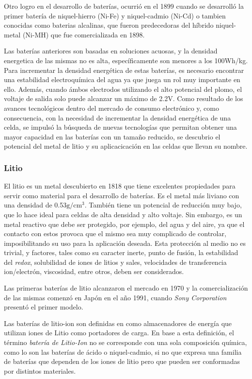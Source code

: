 \documentclass[10pt,a4paper]{article}
\begin{document}
\noindent Otro logro en el desarrollo de baterías, ocurrió en el 1899 cuando se
desarrolló la primer batería de niquel-hierro (Ni-Fe) y niquel-cadmio (Ni-Cd) o
tambien conocidas como baterias alcalinas, que fueron predecedoras del híbrido
niquel-metal (Ni-MH) que fue comercializada en 1898.

\noindent Las baterías anteriores son basadas en soluciones acuosas, y la
densidad energetica de las mismas no es alta, espec\'ificamente son menores a 
los 100Wh/kg. Para incrementar la densidad energética de estas baterías, es
necesario encontrar una estabilidad electroquímica del agua ya que juega un rol
muy importante en ello. Además, cuando \'ambos electrodos utilizando el alto
potencial del plomo, el voltaje de salida solo puede alcanzar un máximo de 2.2V.
Como resultado de los avances tecnol\'ogicos dentro del mercado de consumo
electr\'onico y, como consecuencia, con la necesidad de incrementar la densidad 
energética de una celda, se impuls\'o la b\'usqueda de nuevas tecnolog\'ias que
permitan obtener una mayor capacidad en las bater\'ias con un tamaño reducido, 
se descubrio el potencial del metal de litio y su aplicacicación en las 
celdas que llevan su nombre.

\subsubsection{Litio}

El litio es un metal descubierto en 1818 que tiene excelentes propiedades para
servir como material para el desarrollo de baterías. Es el metal m\'as liviano
con una densidad de 0.53$\mathrm{g/cm^3}$. Tambi\'en tiene un potencial de
reducci\'on muy bajo, que lo hace ideal para celdas de alta densidad y alto
voltaje. Sin embargo, es un metal reactivo que debe ser protegido, por ejemplo,
del agua y del aire, ya que el contacto con estos provoca que el mismo sea muy
complicado de controlar, imposibilitando su uso para la aplicación deseada. Esta
protección al medio no es trivial, y factores, tales como su caracter inerte,
punto de fusión, la estabilidad del \emph{redox}, solubilidad de iones de litios
y sales, velocidades de transferencia ion/electrón, viscosidad, entre otros,
deben ser considerados.

\noindent Las primeras baterías de litio alcanzaron el mercado en 1970 y la
comercialización de las mismas comenzó en Japón en el año 1991, cuando
\emph{Sony Corporation} presentó el primer modelo.

\noindent Las baterías de litio-ion son definidas en \cite{def_liion} como
almacenadores de energía que utilizan iones de Litio como portadores de carga.
En base a esta definición, el término \emph{batería de Litio-Ion} no se
corresponde con una sola composición química, como lo son las baterías de ácido
o niquel-cadmio, si no que expresa una familia de baterías que dependen de los
iones de litio pero que pueden ser conformadas por distintos materiales.
\end{document}
